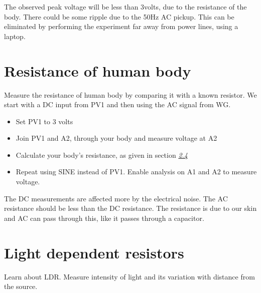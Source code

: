 \documentclass[a4paper,12pt,english]{sphinxmanual}
\let\sphinxpxdimen\pdfpxdimen\else\newdimen\sphinxpxdimen
\begin{document}

The observed peak voltage will be less than 3volts, due to the
resistance of the body. There could be some ripple due to the 50Hz AC
pickup. This can be eliminated by performing the experiment far away
from power lines, using a laptop.


\section{Resistance of human body}
\label{\detokenize{2.9:resistance-of-human-body}}\label{\detokenize{2.9::doc}}

Measure the resistance of human body by comparing it with a known
resistor. We start with a DC input from PV1 and then using the AC signal
from WG.

\noindent\sphinxincludegraphics[width=300\sphinxpxdimen]{{res-body}.pdf}

\begin{itemize}
\item {} 
Set PV1 to 3 volts

\item {} 
Join PV1 and A2, through your body and measure voltage at A2

\item {} 
Calculate your body’s resistance, as given in section
{\hyperref[\detokenize{2.9:sec:Measure-resistance-by-comparison}]{\emph{2.4}}}

\item {} 
Repeat using SINE instead of PV1. Enable analysis on A1 and A2 to
measure voltage.

\end{itemize}


The DC measurements are affected more by the electrical noise. The AC
resistance should be less than the DC resistance. The resistance is due
to our skin and AC can pass through this, like it passes through a
capacitor.


\section{Light dependent resistors}
\label{\detokenize{2.10:light-dependent-resistors}}\label{\detokenize{2.10::doc}}

Learn about LDR. Measure intensity of light and its variation with
distance from the source.
\end{document}
